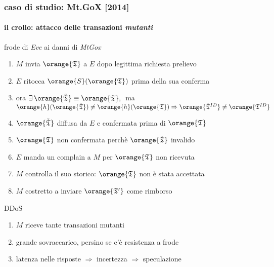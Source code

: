 \begin{frame}
\frametitle{caso di studio: Mt.GoX [2014]}
\framesubtitle{il crollo: attacco delle transazioni \textit{mutanti}}

	{\color{blue} frode} di \textit{Eve} ai danni di \textit{MtGox}
 	\begin{enumerate}
 	  	\item $M$ invia $\orange{\mathfrak{T}}$ a $E$ dopo legittima richiesta prelievo
	 	\item $E$ ritocca $\orange{S}(\orange{\mathfrak{T}})$ prima della sua conferma
	 	\item ora $\exists\,\orange{\tilde{\mathfrak{T}}}\equiv\orange{\mathfrak{T}},\;$ 
	 			ma $\orange{h}(\orange{\tilde{\mathfrak{T}}})\neq \orange{h}(\orange{\mathfrak{T}}) \Rightarrow 
	 			\orange{\tilde{\mathfrak{T}}^{ID}}\neq\orange{\mathfrak{T}^{ID}}$ 
	 	\item $\orange{\tilde{\mathfrak{T}}}$ diffusa da $E$ e confermata prima di $\orange{\mathfrak{T}}$
	 	\item $\orange{\mathfrak{T}}$ non confermata perchè $\orange{\tilde{\mathfrak{T}}}$ invalido
	 	\item $E$ manda un complain a $M$ per $\orange{\mathfrak{T}}$ non ricevuta
	 	\item $M$ controlla il suo storico: $\orange{\mathfrak{T}}$ non è stata accettata
	 	\item $M$ costretto a inviare $\orange{\mathfrak{T}^\prime}$ come rimborso
 	\end{enumerate}

	{\color{blue} DDoS}
	\begin{enumerate}
	  	\item $M$ riceve tante transazioni mutanti
	  	\item grande sovraccarico, persino se c'è resistenza a frode
	  	\item latenza nelle risposte $\Rightarrow$ incertezza $\Rightarrow$ speculazione
	\end{enumerate}

\end{frame}



